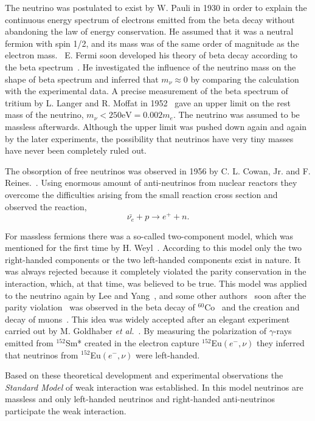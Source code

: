 The neutrino was postulated to exist by W. Pauli in 1930 in order to
explain the continuous energy spectrum of electrons emitted from the
beta decay without abandoning the law of energy conservation. He
assumed that it was a neutral fermion with spin 1/2, and its mass was
of the same order of magnitude as the electron mass.~\cite{Pau30} E.
Fermi soon developed his theory of beta decay according to the beta
spectrum~\cite{Fer33,Fer34}. He investigated the influence of the
neutrino mass on the shape of beta spectrum and inferred that $m_\nu
\approx 0$ by comparing the calculation with the experimental data. A
precise measurement of the beta spectrum of tritium by L. Langer and
R. Moffat in 1952~\cite{Lan52} gave an upper limit on the rest mass of
the neutrino, $m_\nu < 250 \mbox{eV} = 0.002m_e$. The neutrino was
assumed to be massless afterwards. Although the upper limit was pushed
down again and again by the later experiments, the possibility that
neutrinos have very tiny masses have never been completely ruled out.

The obsorption of free neutrinos was observed in 1956 by C. L. Cowan,
Jr. and F. Reines.~\cite{Rei58}. Using enormous amount of
anti-neutrinos from nuclear reactors they overcome the difficulties
arising from the small reaction cross section and observed the
reaction,
\begin{equation}
  \label{eq:nup2en}
  \bar{\nu_e}+p \rightarrow e^{+}+n.
\end{equation}


For massless fermions there was a so-called two-component model, which
was mentioned for the first time by H. Weyl~\cite{Wey29}. According to
this model only the two right-handed components or the two left-handed
components exist in nature. It was always rejected because it
completely violated the parity conservation in the interaction, which,
at that time, was believed to be true. This model was applied to the
neutrino again by Lee and Yang~\cite{Lee57}, and some other
authors~\cite{Sal57,Lan57} soon after the parity
violation~\cite{Lee56} was observed in the beta decay of
$^{60}$Co~\cite{Wu57} and the creation and decay of
muons~\cite{Gar57,Fri57}. This idea was widely accepted after an
elegant experiment carried out by M. Goldhaber \textit{et
  al.}~\cite{Gol58}. By measuring the polarization of $\gamma$-rays
emitted from $^{152}$Sm* created in the electron capture
$^{152}$Eu$(e^-,\nu)$ they inferred that neutrinos from
$^{152}$Eu$(e^-,\nu)$ were left-handed.

Based on these theoretical development and experimental observations
the \emph{Standard Model} of weak interaction was established. In this
model neutrinos are massless and only left-handed neutrinos and
right-handed anti-neutrinos participate the weak interaction.


